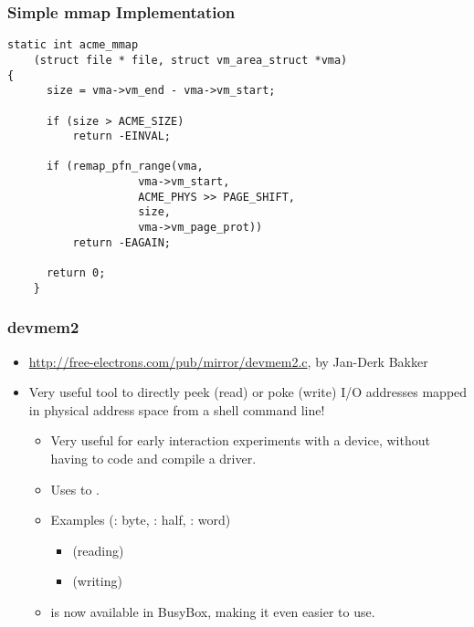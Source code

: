 \begin{frame}[fragile]
  \frametitle{Simple mmap Implementation}
  \begin{verbatim}
static int acme_mmap
    (struct file * file, struct vm_area_struct *vma)
{
      size = vma->vm_end - vma->vm_start;

      if (size > ACME_SIZE)
          return -EINVAL;

      if (remap_pfn_range(vma,
                    vma->vm_start,
                    ACME_PHYS >> PAGE_SHIFT,
                    size,
                    vma->vm_page_prot))
          return -EAGAIN;

      return 0;
    }
  \end{verbatim}
\end{frame}

\begin{frame}
  \frametitle{devmem2}
  \begin{itemize}
  \item \url{http://free-electrons.com/pub/mirror/devmem2.c}, by Jan-Derk
    Bakker
  \item Very useful tool to directly peek (read) or poke
    (write) I/O addresses mapped in physical address space from a
    shell command line!
    \begin{itemize}
    \item Very useful for early interaction experiments with a device,
      without having to code and compile a driver.
    \item Uses  to .
    \item Examples (: byte, : half, : word)
      \begin{itemize}
      \item {} (reading)
      \item {} (writing)
      \end{itemize}
    \item {} is now available in BusyBox, making it even easier to
      use.
    \end{itemize}
  \end{itemize}
\end{frame}


